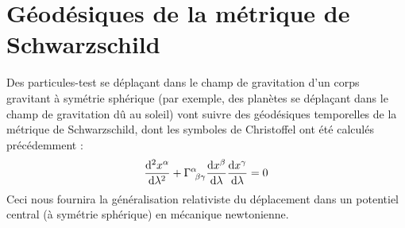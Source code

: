 \section{Géodésiques de la métrique de Schwarzschild}
Des particules-test se déplaçant dans le champ de gravitation d'un corps gravitant à symétrie sphérique (par exemple, des planètes se déplaçant dans le champ de gravitation dû au soleil) vont suivre des géodésiques temporelles de la métrique de Schwarzschild, dont les symboles de Christoffel ont été calculés précédemment :
\begin{equation}
    \label{eq: géodésiques pour la métrique de Schw}
    \frac{\td^2 x^\alpha}{\td \lambda^2} + \Gamma\indices{^\alpha_{\!\beta\gamma}} \frac{\td x^\beta}{\td \lambda} \frac{\td x^\gamma}{\td \lambda} = 0
\end{equation}
Ceci nous fournira la généralisation relativiste du déplacement dans un potentiel central (à symétrie sphérique) en mécanique newtonienne.
